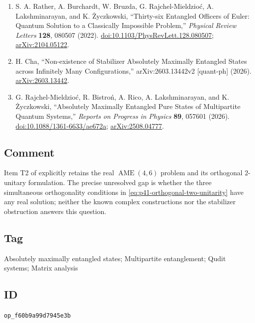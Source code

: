 \begin{enumerate}[label={},leftmargin=4.8em,labelsep=0.5em]
  \footnotesize
  \item[\textup{[RBB+22]}]\label{ref:p41-rather}
  S. A. Rather, A. Burchardt, W. Bruzda, G. Rajchel-Mieldzio\'c,
  A. Lakshminarayan, and K. \.{Z}yczkowski,
  ``Thirty-six Entangled Officers of Euler: Quantum Solution to a
  Classically Impossible Problem,'' \emph{Physical Review Letters}
  \textbf{128}, 080507 (2022).
  \href{https://doi.org/10.1103/PhysRevLett.128.080507}%
       {doi:10.1103/PhysRevLett.128.080507};
  \href{https://arxiv.org/abs/2104.05122}{arXiv:2104.05122}.

  \item[\textup{[Cha26]}]\label{ref:p41-cha}
  H. Cha, ``Non-existence of Stabilizer Absolutely Maximally Entangled
  States across Infinitely Many Configurations,''\newline
  arXiv:2603.13442v2
  [quant-ph] (2026).
  \href{https://arxiv.org/abs/2603.13442}{arXiv:2603.13442}.

  \item[\textup{[RBR+26]}]\label{ref:p41-review}
  G. Rajchel-Mieldzio\'c, R. Bistro\'n, A. Rico, A. Lakshminarayan, and
  K. \.{Z}yczkowski,
  ``Absolutely Maximally Entangled Pure States of Multipartite Quantum
  Systems,'' \emph{Reports on Progress in Physics} \textbf{89}, 057601
  (2026).
  \href{https://doi.org/10.1088/1361-6633/ae672a}%
       {doi:10.1088/1361-6633/ae672a};
  \href{https://arxiv.org/abs/2508.04777}{arXiv:2508.04777}.
\end{enumerate}

\subsection*{Comment}

Item T2 of  explicitly retains the real
$\operatorname{AME}(4,6)$ problem and its orthogonal $2$-unitary formulation.
The precise unresolved gap is whether the three simultaneous orthogonality
conditions in \eqref{eq:p41-orthogonal-two-unitarity} have any real solution;
neither the known complex constructions nor the stabilizer obstruction
answers this question.

\subsection*{Tag}

Absolutely maximally entangled states; Multipartite entanglement; Qudit systems;
Matrix analysis

\subsection*{ID}

\texttt{op\_f60b9a99d7945e3b}
